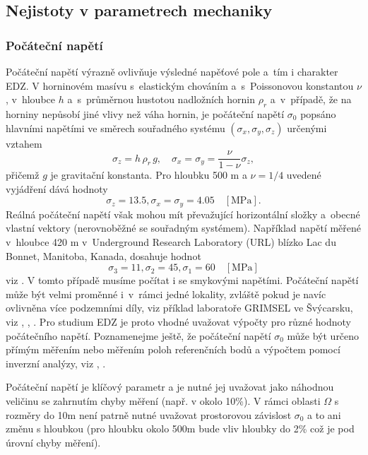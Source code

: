 \documentclass{article}
\begin{document}
\subsection{Nejistoty v parametrech mechaniky}

\subsubsection{Počáteční napětí}
\label{sec:sigma0}
Počáteční napětí výrazně ovlivňuje výsledné napěťové pole a~tím i charakter EDZ.
V horninovém masívu s~elastickým chováním a~s~Poissonovou konstantou $\nu$, v~hloubce $h$ a~s~průměrnou hustotou nadložních hornin $\rho_{r}$ a~v~případě,
že na horniny nepůsobí jiné vlivy než váha hornin, je počáteční napětí $\sigma_0$
popsáno hlavními napětími ve směrech souřadného systému $(\sigma_x, \sigma_y, \sigma_z)$ určenými vztahem
\begin{equation}
	\sigma_z = h\,\rho_{r}\, g, \quad \sigma_x = \sigma_y = \frac{\nu}{1-\nu} \sigma_z,
\end{equation}
přičemž $g$ je gravitační konstanta. Pro hloubku 500 m a $\nu = 1/4$ uvedené vyjádření dává hodnoty
$$
	\sigma_z = 13.5, \sigma_x = \sigma_y = 4.05\quad [\mathrm{MPa}].
$$
Reálná počáteční napětí však mohou mít převažující horizontální složky a~obecné vlastní vektory (nerovnoběžné se souřadným systémem). Například napětí měřené v~hloubce 420 m v~Underground Research Laboratory (URL) blízko Lac du Bonnet, Manitoba, Kanada, dosahuje hodnot
$$
	\sigma_3 = 11, \sigma_2 = 45, \sigma_1 = 60\quad [\mathrm{MPa}]
$$
viz \cite{Rutqvist2009}. V tomto případě musíme počítat i se smykovými napětími. Počáteční napětí může být velmi proměnné i~v~rámci jedné lokality, zvláště pokud je navíc ovlivněna více podzemními díly, viz příklad laboratoře GRIMSEL ve Švýcarsku, viz \cite{Krietsch2019},
\cite{Stas2016}, \cite{Rutqvist2004}. Pro studium EDZ je proto vhodné uvažovat výpočty pro různé hodnoty počátečního napětí.
Poznamenejme  ještě, že počáteční napětí $\sigma_0$ může být určeno přímým měřením nebo měřením poloh referenčních bodů 
a výpočtem pomocí inverzní analýzy, viz \cite{Malik2021}, \cite{Soucek2017}.


Počáteční napětí je klíčový parametr a je nutné jej uvažovat jako náhodnou veličinu se zahrnutím 
chyby měření (např. v \cite{Herget1973} okolo 10\%). V rámci oblasti $\Omega$ s rozměry do 10m není patrně nutné uvažovat prostorovou 
závislost $\sigma_0$ a to ani změnu s hloubkou (pro hloubku okolo 500m bude vliv hloubky do 2\% což je pod úrovní chyby měření).
\end{document}
